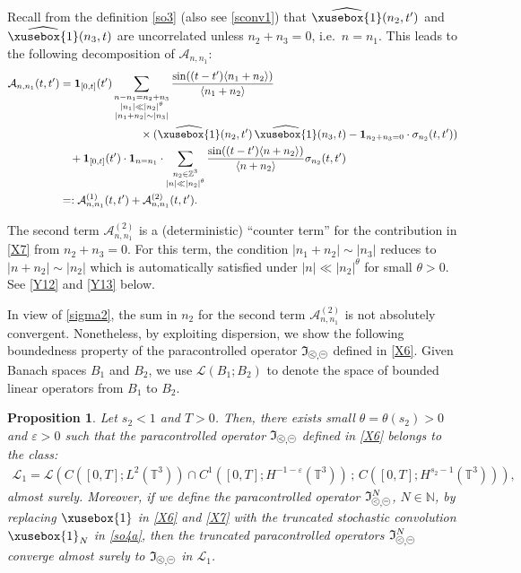 \documentclass[%
11pt,  reqno]{amsart}
\def\<#1>{\xusebox{#1}}
\newcommand{\pe}{\mathbin{\scaleobj{0.7}{\tikz \draw (0,0) node[shape=circle,draw,inner sep=0pt,minimum size=8.5pt] {\scriptsize  $=$};}}}
\newcommand{\pl}{\mathbin{\scaleobj{0.7}{\tikz \draw (0,0) node[shape=circle,draw,inner sep=0pt,minimum size=8.5pt] {\scriptsize $<$};}}}
\newtheorem{proposition}[theorem]{Proposition}
\newcommand{\1}{\hspace{0.2mm}\text{I}\hspace{0.2mm}}
\newcommand{\noi}{\noindent}
\newcommand{\Z}{\mathbb{Z}}
\newcommand{\T}{\mathbb{T}}
\renewcommand{\L}{\mathcal{L}}
\newcommand{\eps}{\varepsilon}
\newcommand{\s}{\sigma}
\newcommand{\ft}{\widehat}
\newcommand{\jb}[1]
{\langle #1 \rangle}
\newcommand{\ind}{\mathbf 1}
\newcommand{\N}{\mathbb{N}}
\newcommand{\If}{\mathfrak{I}}
\newcommand{\A}{\mathcal{A}}
\numberwithin{equation}{section}
\numberwithin{theorem}{section}
\begin{document}
\noi
Recall from the definition \eqref{so3} (also see \eqref{sconv1})
that $\ft{\<1>}(n_2, t')$ and $\ft{\<1>}(n_3, t)$
are uncorrelated unless $n_2+ n_3 = 0$,
i.e.~$n = n_1$.
This leads to the following decomposition of $\A_{n, n_1}$:
\begin{align}
\begin{split}
\A_{n, n_1} (t, t')
& = \ind_{[0 , t]}(t') \sum_{\substack{n - n_1 =  n_2 + n_3\\ |n_1| \ll |n_2|^\theta \\ |n_1 + n_2|\sim |n_3|}}
 \frac{\sin ((t - t') \jb{ n_1 + n_2 })}{\jb{ n_1 + n_2 }} \\
& \hphantom{XXXXXXXX}
\times (   \ft{\<1>}(n_2, t') \, \ft{\<1>}(n_3, t) - \ind_{n_2 + n_3 = 0} \cdot \s_{n_2}(t, t')) \\
& \hphantom{X}
+ \ind_{[0 , t]}(t') \cdot \ind_{n=n_1}\cdot \sum_{\substack{n_2 \in \Z^3 \\ |n| \ll |n_2|^\theta}}
 \frac{\sin ((t - t') \jb{n + n_2 })}{\jb{ n + n_2} } 
 \s_{n_2}(t, t') \\
& = :
\A^{(1)}_{n, n_1} (t, t')+    \A^{(2)}_{n, n_1} (t, t').
\end{split}
\label{X9}
\end{align}


\noi
The second term $\A^{(2)}_{n, n_1}$ is a (deterministic) ``counter term''
for the contribution in \eqref{X7} from $n_2 + n_3 = 0$.
For this term,  the condition $|n_1 + n_2|\sim |n_3|$
reduces to $|n + n_2|\sim |n_2|$ which is automatically satisfied
under $|n| \ll |n_2|^\theta$ for small $\theta > 0$.
See \eqref{Y12} and \eqref{Y13} below.

In view of \eqref{sigma2}, 
 the sum in $n_2$ for the second term $\A^{(2)}_{n, n_1}$ is not absolutely convergent.
Nonetheless, 
by  exploiting dispersion, 
we  
show the following boundedness
property
of the paracontrolled operator $\If_{\pl, \pe}$ defined in \eqref{X6}.
 Given Banach spaces $B_1$ and $B_2$, 
 we use $\L(B_1; B_2)$ to denote the space
 of bounded linear operators from $B_1$ to $B_2$.




\begin{proposition}\label{PROP:sto4}
Let  $ s_2 < 1$ and $T > 0$.
Then, there exists small $\theta = \theta (s_2) > 0$
and $\eps > 0$
such that
the paracontrolled operator $\If_{\pl, \pe}$ 
defined in \eqref{X6}
belongs to  the class:
\begin{align}
\L_1 = \L(C([0, T]; L^2(\T^3) ) \cap C^1([0,T];H^{-1 -\eps}(\T^3))
\, ;\, 
 C([0, T]; H^{s_2 -1}(\T^3) )),
\label{L2}
\end{align}
almost surely.
Moreover, 
if we define  the paracontrolled operator $\If_{\pl, \pe}^N$, $N \in \N$, 
by replacing 
$\<1>$ in \eqref{X6} and \eqref{X7}
with the truncated stochastic convolution $\<1>_N$ in \eqref{so4a}, 
then
the truncated paracontrolled operators $\If_{\pl, \pe}^N$ converge almost surely to $\If_{\pl, \pe}$ 
in $\L_1$.
\end{proposition}
\end{document}
